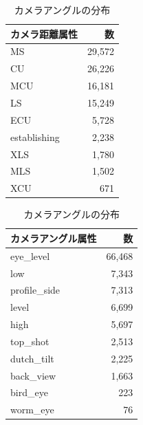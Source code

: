 \documentclass[a4j,12pt,dvipdfmx]{jsreport}
\begin{document}
\begin{table}[htbp]
   \centering
   \begin{minipage}[t]{0.48\linewidth}
      \centering
      \caption{カメラ距離の分布}
      \label{tab:panel_camera_distance_stats}
      \begin{tabular}{lr}
         \toprule
         \textbf{カメラ距離属性} & \textbf{数} \\
         \midrule
         MS               & 29{,}572   \\
         CU               & 26{,}226   \\
         MCU              & 16{,}181   \\
         LS               & 15{,}249   \\
         ECU              & 5{,}728    \\
         establishing     & 2{,}238    \\
         XLS              & 1{,}780    \\
         MLS              & 1{,}502    \\
         XCU              & 671        \\
         \bottomrule
      \end{tabular}
   \end{minipage}
   \hfill
   \begin{minipage}[t]{0.48\linewidth}
      \centering
      \caption{カメラアングルの分布}
      \label{tab:panel_camera_angle_stats}
      \begin{tabular}{lr}
         \toprule
         \textbf{カメラアングル属性} & \textbf{数} \\
         \midrule
         eye\_level         & 66{,}468   \\
         low                & 7{,}343    \\
         profile\_side      & 7{,}313    \\
         level              & 6{,}699    \\
         high               & 5{,}697    \\
         top\_shot          & 2{,}513    \\
         dutch\_tilt        & 2{,}225    \\
         back\_view         & 1{,}663    \\
         bird\_eye          & 223        \\
         worm\_eye          & 76         \\
         \bottomrule
      \end{tabular}
   \end{minipage}
\end{table}
\end{document}
